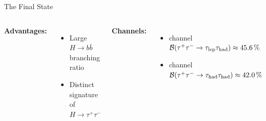 \documentclass[11pt, xcolor={dvipsnames}, aspectratio=169, notes]{beamer}
\begin{document}
\begin{frame}{The \allbold{\bbtautau} Final State}

  \begin{columns}[onlytextwidth]

    \textbf{Advantages:}
    \begin{itemize}
      \setlength{\itemsep}{0.5em}
    \item Large $H \to b\bar{b}$ branching ratio
    \item Distinct signature of $H \to \tau^+\tau^-$
    \end{itemize}

    \vspace{1em}
    \pause

    \textbf{Channels:}
    \begin{itemize}
      \setlength{\itemsep}{0.5em}
    \item<2-> \lephad channel\\
      $\mathcal{B}(\tau^+\tau^- \to \tau_{\text{lep}}\tau_{\text{had}}) \approx \SI{45.6}{\percent}$

    \item<3-> \hadhad channel\\
      $\mathcal{B}(\tau^+\tau^- \to \tau_{\text{had}}\tau_{\text{had}}) \approx \SI{42.0}{\percent}$
    \end{itemize}

     \centering


\end{columns}
\end{frame}
\end{document}

